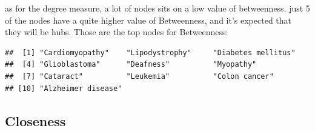 \documentclass[
]{article}
\begin{document}
as for the degree measure, a lot of nodes sits on a low value of betweenness. just 5 of the nodes have a quite higher value of Betweenness, and it's expected that they will be hubs.
Those are the top nodes for Betweenness:

\begin{verbatim}
##  [1] "Cardiomyopathy"    "Lipodystrophy"     "Diabetes mellitus"
##  [4] "Glioblastoma"      "Deafness"          "Myopathy"         
##  [7] "Cataract"          "Leukemia"          "Colon cancer"     
## [10] "Alzheimer disease"
\end{verbatim}

\hypertarget{closeness}{%
\subsection{Closeness}\label{closeness}}
\end{document}
